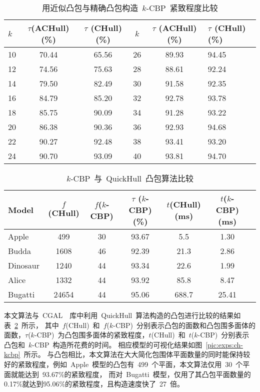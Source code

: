 \begin{table}[htbp]   
\centering
\caption{用近似凸包与精确凸包构造~$k$-CBP~紧致程度比较}
\label{tab:exp:ach:ch:tightness}
\begin{tabular}{lccccl}
\toprule[1.5pt]
$k$ &  $\tau$(ACHull)(\%) & $\tau$ (CHull)(\%)  & $k$ &  $\tau$ (ACHull)(\%) & $\tau$ (CHull)(\%) \\
\midrule[1.0pt]
10 &	70.44 & 	65.56     &26 &	89.93 & 	94.45 \\
12 &	74.56 & 	75.63     &28 &	88.61 & 	92.24 \\
14 &	79.50 & 	82.49     &30 &	91.58 & 	92.35 \\
16 &	84.79 & 	85.20     &32 &	92.78 & 	93.78 \\
18 &	85.75 & 	90.09     &34 &	91.28 & 	93.22 \\
20 &	86.38 & 	90.36     &36 &	92.93 & 	94.68 \\
22 &	90.27 & 	92.48     &38 &	93.41 & 	93.20 \\
24 &	90.70 & 	93.09     &40 &	93.81 & 	94.70 \\
\bottomrule[1.5pt]
\end{tabular}
\end{table}


\begin{table}[htbp] 
\centering
\caption{$k$-CBP~与~QuickHull~凸包算法比较}
\label{tab:exp:cgal}
\begin{tabular}{lcccccl}
\toprule[1.5pt]
 Model & $f$(CHull)& $f$($k$-CBP) & $\tau$ ($k$-CBP)(\%) & $t$(CHull)(ms) & $t$($k$-CBP)(ms)\\ %
\midrule[1.5pt]
  Apple	& 499 & 30 & 93.67 & 5.5 & 1.30 \\ %
  Budda	& 1608 & 46 & 92.39 & 21.3 & 2.86 \\ %
  Dinosaur	& 1240 & 44 & 93.34 & 22.6 & 1.99 \\  %
  Alice	& 1332 & 44 & 93.92 & 85.8 & 8.47\\ %
  Bugatti & 24654 & 44 & 95.06 & 688.7 & 25.41 \\
\bottomrule[1.5pt]
\end{tabular}
\end{table}

本文算法与~CGAL~\cite{cgal}~库中利用~QuickHull~算法构造的凸包进行比较的结果如表~\ref{tab:exp:cgal}~所示，
其中~$f$(CHull)~和~$f$($k$-CBP)~分别表示凸包的面数和凸包围多面体的面数，$\tau$($k$-CBP)~为凸包围多面体的紧致程度，$t$(CHull)~和~$t$($k$-CBP)~分别表示凸包和~$k$-CBP~构造所花费的时间。
相应模型的可视化结果如图~\ref{pic:exps:ch-kcbp}~所示。
与凸包相比，本文算法在大大简化包围体平面数量的同时能保持较好的紧致程度，例如~Apple~模型的凸包有~499~个平面，本文算法仅用~30~个平面就能达到~93.67\%的紧致程度，
而对~Bugatti~模型，仅用了其凸包平面数量的0.17\%就达到95.06\%的紧致程度，且构造速度快了~27~倍。

